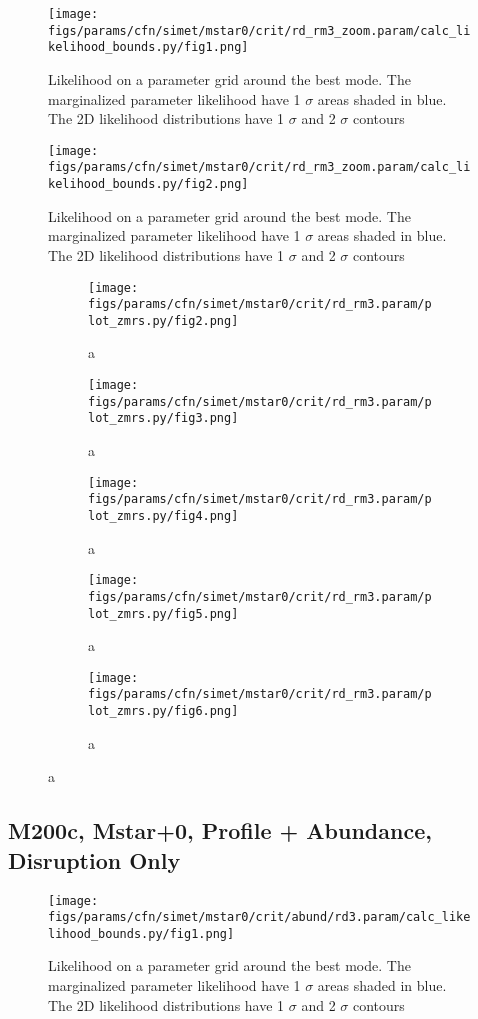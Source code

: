 \documentclass[twocolumn]{article}
\begin{document}
\begin{figure}[H]
  \center\texttt{[image: figs/params/cfn/simet/mstar0/crit/rd\_rm3\_zoom.param/calc\_likelihood\_bounds.py/fig1.png]}
  \caption{Likelihood on a parameter grid around the best mode. The marginalized parameter likelihood have
    1 $\sigma$ areas shaded in blue. The 2D likelihood distributions have 1 $\sigma$  and 2 $\sigma$ contours}
  \label{fig:basic_rd:likelihood}
\end{figure}

\begin{figure}[H]
  \center\texttt{[image: figs/params/cfn/simet/mstar0/crit/rd\_rm3\_zoom.param/calc\_likelihood\_bounds.py/fig2.png]}
  \caption{Likelihood on a parameter grid around the best mode. The marginalized parameter likelihood have
    1 $\sigma$ areas shaded in blue. The 2D likelihood distributions have 1 $\sigma$  and 2 $\sigma$ contours}
  \label{fig:basic_rd:likelihood}
\end{figure}

\begin{figure}
  \begin{subfigure}{.5\textwidth}
    \centering\texttt{[image: figs/params/cfn/simet/mstar0/crit/rd\_rm3.param/plot\_zmrs.py/fig2.png]}
    \caption{a}
  \end{subfigure}
  \begin{subfigure}{.5\textwidth}
    \centering\texttt{[image: figs/params/cfn/simet/mstar0/crit/rd\_rm3.param/plot\_zmrs.py/fig3.png]}
    \caption{a}
  \end{subfigure}
  \begin{subfigure}{.5\textwidth}
    \centering\texttt{[image: figs/params/cfn/simet/mstar0/crit/rd\_rm3.param/plot\_zmrs.py/fig4.png]}
    \caption{a}
  \end{subfigure}%
  \begin{subfigure}{.5\textwidth}
    \centering\texttt{[image: figs/params/cfn/simet/mstar0/crit/rd\_rm3.param/plot\_zmrs.py/fig5.png]}
    \caption{a}
  \end{subfigure}
  \begin{subfigure}{.5\textwidth}
    \centering\texttt{[image: figs/params/cfn/simet/mstar0/crit/rd\_rm3.param/plot\_zmrs.py/fig6.png]}
    \caption{a}
  \end{subfigure}
\end{figure}
\clearpage

\subsection{M200c, Mstar+0, Profile + Abundance, Disruption Only}
\begin{figure}[H]
  \center\texttt{[image: figs/params/cfn/simet/mstar0/crit/abund/rd3.param/calc\_likelihood\_bounds.py/fig1.png]}
  \caption{Likelihood on a parameter grid around the best mode. The marginalized parameter likelihood have
    1 $\sigma$ areas shaded in blue. The 2D likelihood distributions have 1 $\sigma$  and 2 $\sigma$ contours}
  \label{fig:basic_rd:likelihood}
\end{figure}
\end{document}
